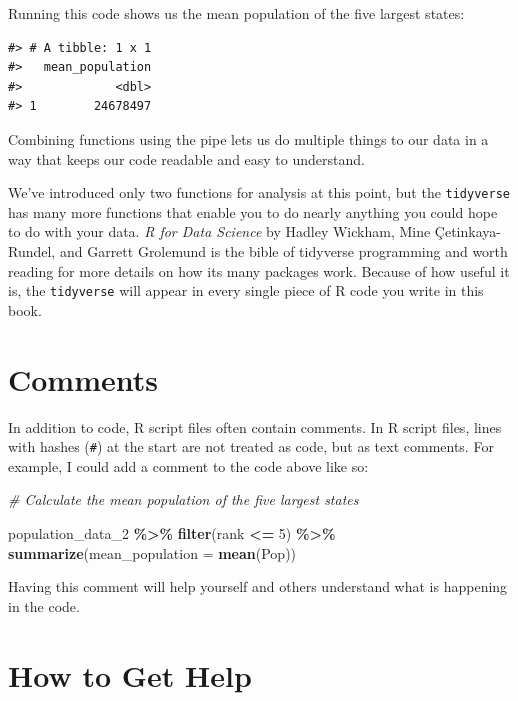 \documentclass[
]{book}
\newenvironment{Shaded}{\begin{snugshade}}{\end{snugshade}}
\newcommand{\AttributeTok}[1]{\textcolor[rgb]{0.13,0.29,0.53}{#1}}
\newcommand{\CommentTok}[1]{\textcolor[rgb]{0.56,0.35,0.01}{\textit{#1}}}
\newcommand{\DecValTok}[1]{\textcolor[rgb]{0.00,0.00,0.81}{#1}}
\newcommand{\FunctionTok}[1]{\textcolor[rgb]{0.13,0.29,0.53}{\textbf{#1}}}
\newcommand{\NormalTok}[1]{#1}
\newcommand{\SpecialCharTok}[1]{\textcolor[rgb]{0.81,0.36,0.00}{\textbf{#1}}}
\begin{document}
Running this code shows us the mean population of the five largest states:

\begin{verbatim}
#> # A tibble: 1 x 1
#>   mean_population
#>             <dbl>
#> 1        24678497
\end{verbatim}

Combining functions using the pipe lets us do multiple things to our data in a way that keeps our code readable and easy to understand.

We've introduced only two functions for analysis at this point, but the \texttt{tidyverse} has many more functions that enable you to do nearly anything you could hope to do with your data. \emph{R for Data Science} by Hadley Wickham, Mine Çetinkaya-Rundel, and Garrett Grolemund is the bible of tidyverse programming and worth reading for more details on how its many packages work. Because of how useful it is, the \texttt{tidyverse} will appear in every single piece of R code you write in this book.

\hypertarget{comments}{%
\section*{Comments}\label{comments}}

In addition to code, R script files often contain comments. In R script files, lines with hashes (\texttt{\#}) at the start are not treated as code, but as text comments. For example, I could add a comment to the code above like so:

\begin{Shaded}
\begin{Highlighting}[]
\CommentTok{\# Calculate the mean population of the five largest states}

\NormalTok{population\_data\_2 }\SpecialCharTok{\%\textgreater{}\%} 
  \FunctionTok{filter}\NormalTok{(rank }\SpecialCharTok{\textless{}=} \DecValTok{5}\NormalTok{) }\SpecialCharTok{\%\textgreater{}\%} 
  \FunctionTok{summarize}\NormalTok{(}\AttributeTok{mean\_population =} \FunctionTok{mean}\NormalTok{(Pop))}
\end{Highlighting}
\end{Shaded}

Having this comment will help yourself and others understand what is happening in the code.

\hypertarget{how-to-get-help}{%
\section*{How to Get Help}\label{how-to-get-help}}
\end{document}
